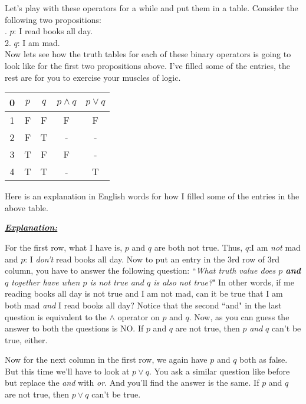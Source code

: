 \documentclass[a4paper]{article}
\begin{document}
\begin{exercise}
Let's play with these operators for a while and put them in a table. Consider the following two propositions: \\

. $p$: I read books all day. \\
2. $q$: I am mad. \\

Now lets see how the truth tables for each of these binary operators is going to look like for the first two propositions above. I've filled some of the entries, the rest are for you to exercise your muscles of logic. 

\begin{center}
	\begin{tabular}{c||c|c||c|c}
		0 & $p$ & $q$ & $p \land q$ & $p \lor q$ \\
		\hline
		1 & F & F & F & F	\\
		2 & F & T & - & - 	\\	
		3 & T & F & F & -	\\	
		4 & T & T & - & T	\\

	\end{tabular}
\end{center}
\end{exercise}

Here is an explanation in English words for how I filled some of the entries in the above table. 

\vspace{2.5mm}
\textbf{\textit{\underline{Explanation:}}} \\
\vspace{2.5mm}
\noindent

For the first row, what I have is, $p$ and $q$ are both not true. Thus, $q$:I am \textit{not} mad and $p$: I \textit{don't} read books all day. Now to put an entry in the 3rd row of 3rd column, you have to answer the following question: ``\textit{What truth value does $p$ \textbf{and} $q$ together have when $p$ is not true and $q$ is also not true?}" In other words, if me reading books all day is not true and I am not mad, can it be true that I am both mad \textit{and} I read books all day? Notice that the second ``and" in the last question is equivalent to the $\land$ operator on $p$ and $q$. Now, as you can guess the answer to both the questions is NO. If $p$ and $q$ are not true, then $p$ \textit{and} $q$ can't be true, either. 

Now for the next column in the first row, we again have $p$ and $q$ both as false. But this time we'll have to look at $p \lor q$. You ask a similar question like before but replace the \textit{and} with \textit{or}. And you'll find the answer is the same. If $p$ and $q$ are not true, then $p \lor q$ can't be true. 
\end{document}
